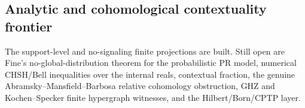 \subsection{Analytic and cohomological contextuality frontier}

\begin{theorem}\label{thm:quantum-contextuality-analytic-frontier}\notready{}
The support-level and no-signaling finite projections are built. Still open are
Fine's no-global-distribution theorem for the probabilistic PR model,
numerical CHSH/Bell inequalities over the internal reals, contextual fraction,
the genuine Abramsky--Mansfield--Barbosa relative cohomology obstruction, GHZ
and Kochen--Specker finite hypergraph witnesses, and the Hilbert/Born/CPTP
layer.
\end{theorem}
